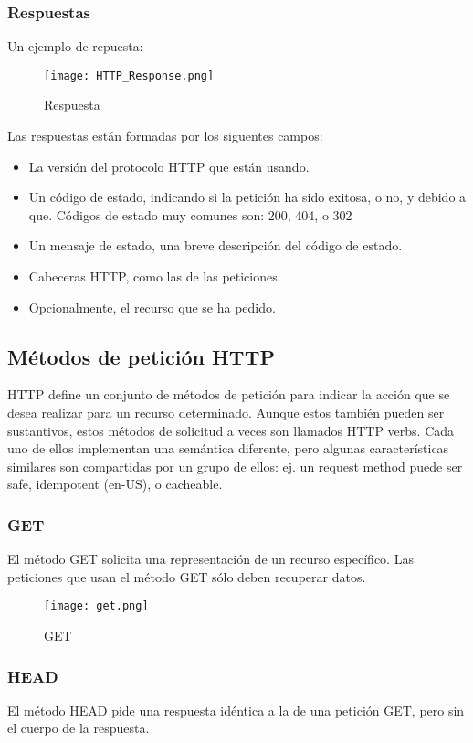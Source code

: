 \subsubsection{Respuestas}
Un ejemplo de repuesta:
\begin{figure}[H]
	\center
	\texttt{[image: HTTP\_Response.png]}
	\caption{Respuesta}
	\label{fig:super}
\end{figure}
Las respuestas están formadas por los siguentes campos:

\begin{itemize}
	\item La versión del protocolo HTTP que están usando.
	\item Un código de estado, indicando si la petición ha sido exitosa, o no, y debido a que. Códigos de estado muy comunes son:  200, 404, o 302
	\item Un mensaje de estado, una breve descripción del código de estado. 
	\item Cabeceras HTTP, como las de las peticiones.
	\item Opcionalmente, el recurso que se ha pedido.
\end{itemize}

\subsection{Métodos de petición HTTP}

HTTP define un conjunto de métodos de petición para indicar la acción que se desea realizar para un recurso determinado. Aunque estos también pueden ser sustantivos, estos métodos de solicitud a veces son llamados HTTP verbs. Cada uno de ellos implementan una semántica diferente, pero algunas características similares son compartidas por un grupo de ellos: ej. un request method puede ser safe, idempotent (en-US), o cacheable.

\subsubsection{GET}
El método GET  solicita una representación de un recurso específico. Las peticiones que usan el método GET sólo deben recuperar datos.

\begin{figure}[H]
	\center
	\texttt{[image: get.png]}
	\caption{GET}
	\label{fig:super}
\end{figure}

\subsubsection{HEAD}
El método HEAD pide una respuesta idéntica a la de una petición GET, pero sin el cuerpo de la respuesta.


